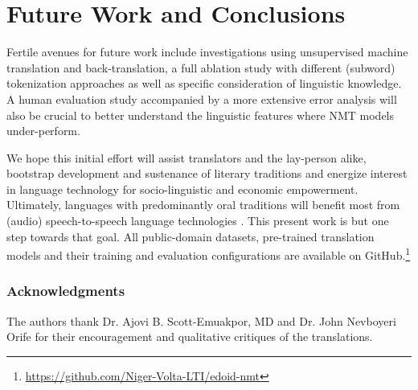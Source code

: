 \documentclass{article} %
\begin{document}
\section{Future Work and Conclusions}
Fertile avenues for future work include investigations using unsupervised machine translation and back-translation, a full ablation study with different (subword) tokenization approaches as well as specific consideration of linguistic knowledge. A human evaluation study accompanied by a more extensive error analysis will also be crucial to better understand the linguistic features where NMT models under-perform.

We hope this initial effort will assist translators and the lay-person alike, bootstrap development and sustenance of literary traditions and energize interest in language technology for socio-linguistic and economic empowerment. Ultimately, languages with predominantly oral traditions will benefit most from (audio) speech-to-speech language technologies \citep{jia2019direct}. This present work is but one step towards that goal. All public-domain datasets, pre-trained translation models and their training and evaluation configurations are available on GitHub.\footnote{\url{https://github.com/Niger-Volta-LTI/edoid-nmt}}
 
% 




\subsubsection*{Acknowledgments}
The authors thank Dr. Ajovi B. Scott-Emuakpor, MD and Dr. John Nevboyeri Orife for their encouragement and qualitative critiques of the translations.
\end{document}
